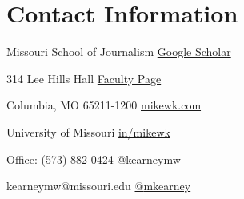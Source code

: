 
\section{Contact Information}

Missouri School of Journalism     \hfill \href{https://scholar.google.com/citations?user=j3EZl3MAAAAJ}{Google Scholar} \faGoogle

314 Lee Hills Hall                \hfill \href{https://journalism.missouri.edu/staff/mike-kearney/}{Faculty Page}      \faUniversity

Columbia, MO 65211-1200           \hfill \href{https://mikewk.com/}{mikewk.com}                                        \faHome

University of Missouri            \hfill \href{https://www.linkedin.com/in/mikewk/}{in/mikewk}
\faLinkedin

Office: (573) 882-0424            \hfill \href{https://twitter.com/kearneymw}{{@}kearneymw}                            \faTwitter

kearneymw{@}missouri.edu          \hfill \href{https://github.com/mkearney/}{{@}mkearney}                              \faGithub
